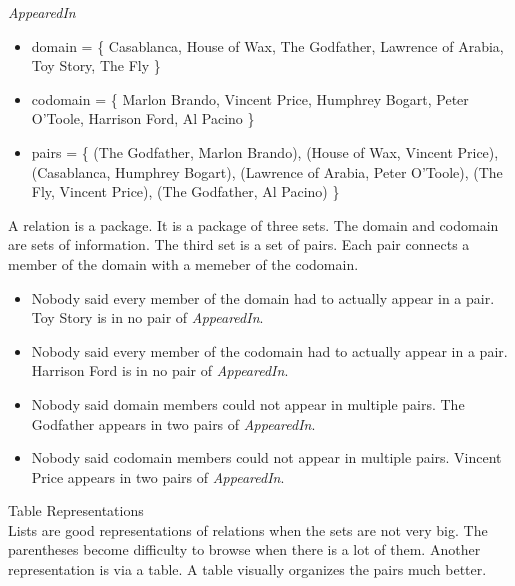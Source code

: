 \documentclass{ximera}
\begin{document}
\begin{example} \textit{AppearedIn}
\begin{itemize}
\item domain = \{ Casablanca, House of Wax,  The Godfather, Lawrence of Arabia, Toy Story, The Fly \}  
\item codomain = \{ Marlon Brando, Vincent Price, Humphrey Bogart, Peter O'Toole, Harrison Ford, Al Pacino  \} 
\item pairs = \{ (The Godfather, Marlon Brando), (House of Wax, Vincent Price), (Casablanca, Humphrey Bogart), (Lawrence of Arabia, Peter O'Toole), (The Fly, Vincent Price), (The Godfather, Al Pacino) \} 
\end{itemize}
\end{example}


A relation is a package.  It is a package of three sets. The domain and codomain are sets of information.  The third set is a set of pairs.  Each pair connects a member of the domain with a memeber of the codomain. 

\begin{observation}
\begin{itemize}
\item Nobody said every member of the domain had to actually appear in a pair.  Toy Story is in no pair of \textit{AppearedIn}.
\item Nobody said every member of the codomain had to actually appear in a pair.  Harrison Ford is in no pair of \textit{AppearedIn}.
\item Nobody said domain members could not appear in multiple pairs.  The Godfather appears in two pairs of \textit{AppearedIn}.
\item Nobody said codomain members could not appear in multiple pairs.  Vincent Price appears in two pairs of \textit{AppearedIn}.
\end{itemize}
\end{observation}



\large{Table Representations} \\

Lists are good representations of relations when the sets are not very big. The parentheses become difficulty to browse when there is a lot of them. Another representation is via a table. A table visually organizes the pairs much better.
\end{document}
